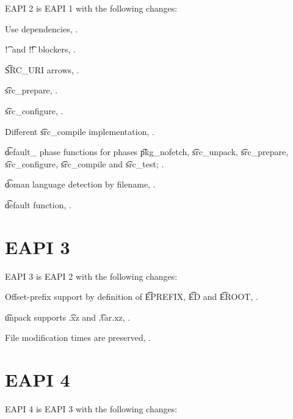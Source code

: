 EAPI 2 is EAPI 1 with the following changes:

\begin{compactitem}
\item Use dependencies, .
\item \t{!}\ and \t{!!}\ blockers, .
\item \t{SRC_URI} arrows, .
\item \t{src_prepare}, .
\item \t{src_configure}, .
\item Different \t{src_compile} implementation, .
\item \t{default_} phase functions for phases \t{pkg_nofetch}, \t{src_unpack}, \t{src_prepare},
    \t{src_configure}, \t{src_compile} and \t{src_test}; .
\item \t{doman} language detection by filename, .
\item \t{default} function, .
\end{compactitem}

\section{EAPI 3}

EAPI 3 is EAPI 2 with the following changes:
\begin{compactitem}
\item Offset-prefix support by definition of \t{EPREFIX}, \t{ED} and \t{EROOT},
    .
\item \t{unpack} supports \t{.xz} and \t{.tar.xz}, .
\item File modification times are preserved, .
\end{compactitem}

\section{EAPI 4}

EAPI 4 is EAPI 3 with the following changes:

